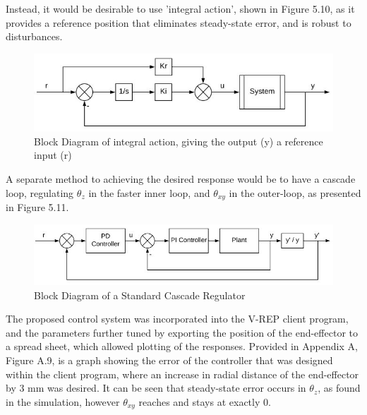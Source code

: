 \documentclass[12pt,openany,a4paper]{book}
\begin{document}
Instead, it would be desirable to use 'integral action', shown in Figure 5.10, as it provides a reference position that eliminates steady-state error, and is robust to disturbances.

\begin{center}
\begin{figure}[htb]
  \includegraphics[width=1\linewidth]{control_system_integral_action.jpg}
\caption{Block Diagram of integral action, giving the output (y) a reference input (r)}
\end{figure}
\end{center}


A separate method to achieving the desired response would be to have a cascade loop, regulating $\theta_z$ in the faster inner loop, and $\theta_{xy}$ in the outer-loop, as presented in Figure 5.11.

\begin{center}
\begin{figure}[htb]
  \includegraphics[width=1\linewidth]{control_system_cascade.jpg}
\caption{Block Diagram of a Standard Cascade Regulator}
\end{figure}
\end{center}

The proposed control system was incorporated into the V-REP client program, and the parameters further tuned by exporting the position of the end-effector to a spread sheet, which allowed plotting of the responses. Provided in Appendix A, Figure A.9, is a graph showing the error of the controller that was designed within the client program, where an increase in radial distance of the end-effector by 3 mm was desired. It can be seen that steady-state error occurs in $\theta_z$, as found in the simulation, however $\theta_{xy}$ reaches and stays at exactly 0.

\end{document}

